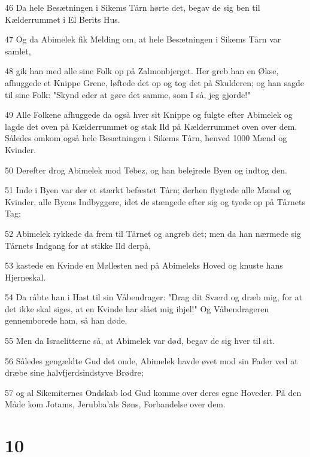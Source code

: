 \par 46 Da hele Besætningen i Sikems Tårn hørte det, begav de sig ben til Kælderrummet i El Berits Hus.
\par 47 Og da Abimelek fik Melding om, at hele Besætningen i Sikems Tårn var samlet,
\par 48 gik han med alle sine Folk op på Zalmonbjerget. Her greb han en Økse, afhuggede et Knippe Grene, løftede det op og tog det på Skulderen; og han sagde til sine Folk: "Skynd eder at gøre det samme, som I så, jeg gjorde!"
\par 49 Alle Folkene afhuggede da også hver sit Knippe og fulgte efter Abimelek og lagde det oven på Kælderrummet og stak Ild på Kælderrummet oven over dem. Således omkom også hele Besætningen i Sikems Tårn, henved 1000 Mænd og Kvinder.
\par 50 Derefter drog Abimelek mod Tebez, og han belejrede Byen og indtog den.
\par 51 Inde i Byen var der et stærkt befæstet Tårn; derhen flygtede alle Mænd og Kvinder, alle Byens Indbyggere, idet de stængede efter sig og tyede op på Tårnets Tag;
\par 52 Abimelek rykkede da frem til Tårnet og angreb det; men da han nærmede sig Tårnets Indgang for at stikke Ild derpå,
\par 53 kastede en Kvinde en Møllesten ned på Abimeleks Hoved og knuste hans Hjerneskal.
\par 54 Da råbte han i Hast til sin Våbendrager: "Drag dit Sværd og dræb mig, for at det ikke skal siges, at en Kvinde har slået mig ihjel!" Og Våbendrageren gennemborede ham, så han døde.
\par 55 Men da Israelitterne så, at Abimelek var død, begav de sig hver til sit.
\par 56 Således gengældte Gud det onde, Abimelek havde øvet mod sin Fader ved at dræbe sine halvfjerdsindstyve Brødre;
\par 57 og al Sikemiternes Ondskab lod Gud komme over deres egne Hoveder. På den Måde kom Jotams, Jerubba'als Søns, Forbandelse over dem.

\chapter{10}

